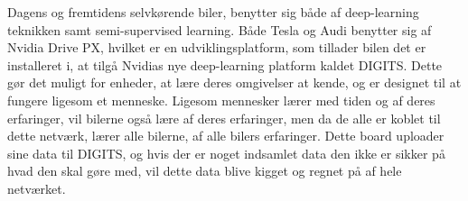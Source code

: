 Dagens og fremtidens selvkørende biler, benytter sig både af deep-learning teknikken samt semi-supervised learning\cite{Musk}. Både Tesla og Audi benytter sig af Nvidia Drive PX, hvilket er en udviklingsplatform, som tillader bilen det er installeret i, at tilgå Nvidias nye deep-learning platform kaldet DIGITS. Dette gør det muligt for enheder, at lære deres omgivelser at kende, og er designet til at fungere ligesom et menneske. Ligesom mennesker lærer med tiden og af deres erfaringer, vil bilerne også lære af deres erfaringer, men da de alle er koblet til dette netværk, lærer alle bilerne, af alle bilers erfaringer\cite{Nvidia}. Dette board uploader sine data til DIGITS, og hvis der er noget indsamlet data den ikke er sikker på hvad den skal gøre med, vil dette data blive kigget og regnet på af hele netværket.